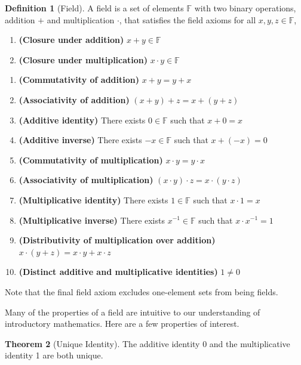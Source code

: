 \documentclass[12pt]{report}
\numberwithin{equation}{section}
\theoremstyle{definition}
\newtheorem{theorem}{Theorem}[section]
\newtheorem{definition}[theorem]{Definition}
\begin{document}
	\begin{definition}[Field]
		A field is a set of elements $ \mathbb{F} $ with two binary operations, addition $ + $ and multiplication $ \cdot $, that satisfies the field axioms for all $ x,y,z\in \mathbb{F} $, 
		\begin{enumerate}[label=C\arabic*, start=1]   
			\item \textbf{(Closure under addition)} $ x+y \in \mathbb{F} $
			\item \textbf{(Closure under multiplication) } $ x\cdot y \in \mathbb{F} $
		\end{enumerate}
		\begin{enumerate}[label=A\arabic*, start=1]   
			\item \textbf{(Commutativity of addition) }$ x+y = y+x $
			\item \textbf{(Associativity of addition)} $ (x+y)+z = x+(y+z) $
			\item \textbf{(Additive identity) }There exists $ 0\in \mathbb{F} $ such that $ x+0=x  $
			\item \textbf{(Additive inverse) }There exists $ -x \in \mathbb{F} $ such that $ x+(-x)=0 $
			\item \textbf{(Commutativity of multiplication)} $ x\cdot y = y\cdot x $
			\item \textbf{(Associativity of multiplication)} $ (x\cdot y)\cdot z = x\cdot (y\cdot z) $
			\item \textbf{(Multiplicative identity)} There exists $ 1\in \mathbb{F} $ such that $ x\cdot 1=x  $ 
			\item \textbf{(Multiplicative inverse) }There exists $ x^{-1} \in \mathbb{F} $ such that $ x\cdot x^{-1}=1 $
			\item \textbf{(Distributivity of multiplication over addition)} $ x\cdot(y+z)  = x\cdot y + x\cdot z$
			\item \textbf{(Distinct additive and multiplicative identities)} $ 1\neq 0 $
		\end{enumerate}
		\label{def:field axiom}
	\end{definition}
	
	Note that the final field axiom excludes one-element sets from being fields. 
	
	Many of the properties of a field are intuitive to our understanding of introductory mathematics. Here are a few properties of interest.
	
	\begin{theorem}[Unique Identity]
		The additive identity 0 and the multiplicative identity 1 are both unique. 
	\end{theorem}
\end{document}
